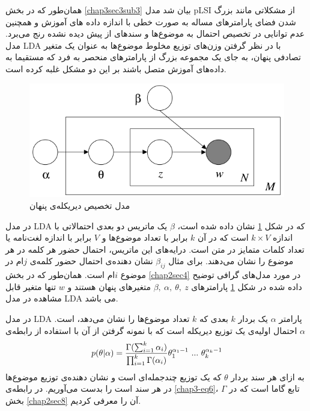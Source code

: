 همان‌طور که در بخش
\ref{chap3sec3sub3}
بیان شد مدل
pLSI
از مشکلاتی مانند بزرگ شدن فضای پارامترهای مساله به صورت خطی‌ با اندازه داده ‌های آموزش و همچنین عدم توانایی در تخصیص احتمال به موضوع‌ها و سند‌های از پیش دیده نشده رنج می‌‌برد. مدل
LDA
با در نظر گرفتن وزن‌های توزیع مخلوط موضوع‌ها به عنوان یک متغیر تصادفی پنهان، به جای یک مجموعه بزرگ از پارامترهای منحصر به فرد که 
مستقیما به داده‌های آموزش متصل باشند بر این دو مشکل غلبه کرده است.
	\begin{figure}[!t]
		\centering
		\includegraphics[scale=0.4]{chap3-img/LDA}
		\caption{مدل تخصیص دیریکله‌ی پنهان \cite{blei2003latent}}
		\label{chap3-fig5}
	\end{figure}

در مدل
LDA
که در شکل
\ref{chap3-fig5}
نشان داده شده است،
$\beta$
یک ماتریس دو بعدی احتمالاتی با اندازه
$k \times V$
 است که در آن
$k$
برابر با تعداد موضوع‌ها و
$V$
برابر با اندازه لغت‌نامه‌ یا تعداد کلمات متمایز در متن است. درایه‌های این ماتریس، احتمال حضور هر کلمه در هر موضوع را نشان می‌‌دهند. برای مثال
$\beta_{ij}$
نشان دهنده‌ی احتمال حضور کلمه‌ی
$j$ام
 در موضوع
$i$ام
 است. همان‌طور که در بخش
\ref{chap2sec4}
در مورد مدل‌های گرافی توضیح داده شده در شکل
\ref{chap3-fig5}
پارامتر‌های
$\beta,\ \alpha,\ \theta ,\ z$
متغیر‌های پنهان هستند و
$w$
تنها متغیر قابل مشاهده در مدل
LDA
می‌ باشد.

در مدل
LDA
پارامتر
$\alpha$
یک بردار
$k$
بعدی که
$k$
تعداد موضوع‌ها را نشان می‌دهد، است.
$\alpha$
احتمال اولیه‌ی یک توزیع دیریکله است که با نمونه گرفتن از آن با استفاده از رابطه‌ی
\begin{align}
	\centering
	\label{chap3-eq6}
	p(\theta|\alpha) = \dfrac{\Gamma (\sum_{i=1}^{k} \alpha_i)}{\prod_{i=1}^{k} \Gamma(\alpha_i)} \theta_1^{\alpha_1 -1}\ ...\ \theta_k^{\alpha_k -1}
\end{align}
به ازای هر سند بردار
$\theta$
که یک توزیع چندجمله‌ای است و نشان دهنده‌ی توزیع موضوع‌ها در هر سند است را بدست می‌‌آوریم. در رابطه‌ی
\ref{chap3-eq6}، $\Gamma$
تابع گاما است که در بخش
\ref{chap2sec8}
آن را معرفی‌ کردیم.


